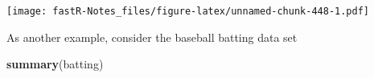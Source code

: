 \documentclass[]{book}
\newenvironment{Shaded}{\begin{snugshade}}{\end{snugshade}}
\newcommand{\KeywordTok}[1]{\textcolor[rgb]{0.13,0.29,0.53}{\textbf{#1}}}
\newcommand{\DataTypeTok}[1]{\textcolor[rgb]{0.13,0.29,0.53}{#1}}
\newcommand{\OperatorTok}[1]{\textcolor[rgb]{0.81,0.36,0.00}{\textbf{#1}}}
\newcommand{\NormalTok}[1]{#1}
\theoremstyle{definition}
\theoremstyle{definition}
\theoremstyle{definition}
\theoremstyle{remark}
\begin{document}
\begin{Shaded}
\end{Shaded}

\texttt{[image: fastR-Notes\_files/figure-latex/unnamed-chunk-448-1.pdf]}

As another example, consider the baseball batting data set

\begin{Shaded}
\begin{Highlighting}[]
\KeywordTok{summary}\NormalTok{(batting)}
\end{Highlighting}
\end{Shaded}
\end{document}
